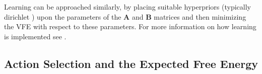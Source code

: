 Learning can be approached similarly, by placing suitable hyperpriors (typically dirichlet \citep{schwartenbeck_computational_2019}) upon the parameters of the $\boldsymbol{A}$ and $\boldsymbol{B}$ matrices and then minimizing the VFE with respect to these parameters. For more information on how learning is implemented see \citet{da2020active,friston2017process}.


\subsection{Action Selection and the Expected Free Energy}



